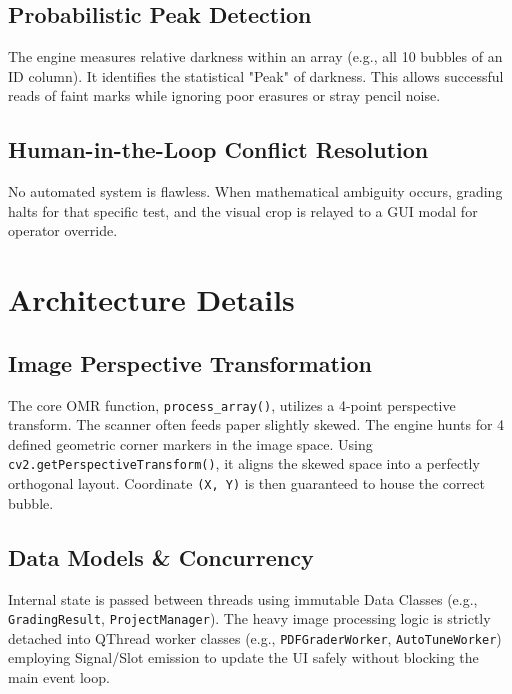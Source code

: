 \documentclass[12pt,a4paper]{article}
\begin{document}
\subsection{Probabilistic Peak Detection}
The engine measures relative darkness within an array (e.g., all 10 bubbles of an ID column). It identifies the statistical "Peak" of darkness. This allows successful reads of faint marks while ignoring poor erasures or stray pencil noise.

\subsection{Human-in-the-Loop Conflict Resolution}
No automated system is flawless. When mathematical ambiguity occurs, grading halts for that specific test, and the visual crop is relayed to a GUI modal for operator override.

\section{Architecture Details}

\subsection{Image Perspective Transformation}
The core OMR function, \texttt{process\_array()}, utilizes a 4-point perspective transform. The scanner often feeds paper slightly skewed. The engine hunts for 4 defined geometric corner markers in the image space. Using \texttt{cv2.getPerspectiveTransform()}, it aligns the skewed space into a perfectly orthogonal layout. Coordinate \texttt{(X, Y)} is then guaranteed to house the correct bubble.

\subsection{Data Models \& Concurrency}
Internal state is passed between threads using immutable Data Classes (e.g., \texttt{GradingResult}, \texttt{ProjectManager}). The heavy image processing logic is strictly detached into QThread worker classes (e.g., \texttt{PDFGraderWorker}, \texttt{AutoTuneWorker}) employing Signal/Slot emission to update the UI safely without blocking the main event loop.

\end{document}
